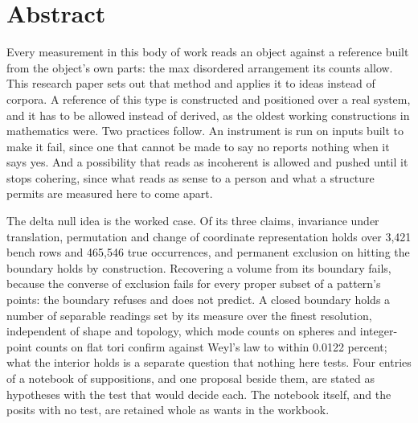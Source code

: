 \chapter*{Abstract}

Every measurement in this body of work reads an object against a reference built from the object's
own parts: the max disordered arrangement its counts allow. This research paper sets out that method
and applies it to ideas instead of corpora. A reference of this type is constructed and positioned over a
real system, and it has to be allowed instead of derived, as the oldest working constructions in
mathematics were. Two practices follow. An instrument is run on inputs built to make it fail, since one
that cannot be made to say no reports nothing when it says yes. And a possibility that reads as
incoherent is allowed and pushed until it stops cohering, since what reads as sense to a person and
what a structure permits are measured here to come apart.

The delta null idea is the worked case. Of its three claims, invariance under translation,
permutation and change of coordinate representation holds over 3{,}421 bench rows and 465{,}546 true
occurrences, and permanent exclusion on hitting the boundary holds by construction. Recovering a volume
from its boundary fails, because the converse of exclusion fails for every proper subset of a
pattern's points: the boundary refuses and does not predict. A closed boundary holds a number of
separable readings set by its measure over the finest resolution, independent of shape and topology,
which mode counts on spheres and integer-point counts on flat tori confirm against Weyl's law to within
0.0122 percent; what the interior holds is a separate question that nothing here tests. Four entries of
a notebook of suppositions, and one proposal beside them, are stated as hypotheses with the test that
would decide each. The notebook itself, and the posits with no test, are retained whole as wants in the
workbook.
\cleardoublepage
